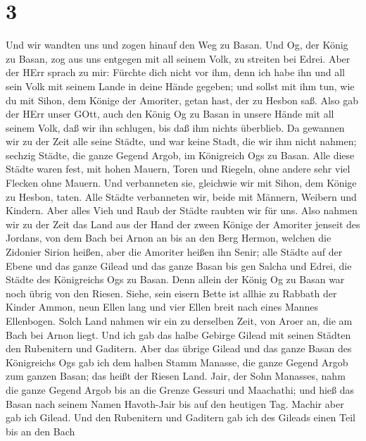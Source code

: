 \hypertarget{section-2}{%
\section{3}\label{section-2}}

 Und wir wandten uns und zogen hinauf den Weg zu Basan. Und
Og, der König zu Basan, zog aus uns entgegen mit all seinem Volk, zu
streiten bei Edrei.  Aber der HErr sprach zu mir: Fürchte
dich nicht vor ihm, denn ich habe ihn und all sein Volk mit seinem Lande
in deine Hände gegeben; und sollst mit ihm tun, wie du mit Sihon, dem
Könige der Amoriter, getan hast, der zu Hesbon saß.  Also
gab der HErr unser GOtt, auch den König Og zu Basan in unsere Hände mit
all seinem Volk, daß wir ihn schlugen, bis daß ihm nichts überblieb.
 Da gewannen wir zu der Zeit alle seine Städte, und war
keine Stadt, die wir ihm nicht nahmen; sechzig Städte, die ganze Gegend
Argob, im Königreich Ogs zu Basan.  Alle diese Städte waren
fest, mit hohen Mauern, Toren und Riegeln, ohne andere sehr viel Flecken
ohne Mauern.  Und verbanneten sie, gleichwie wir mit Sihon,
dem Könige zu Hesbon, taten. Alle Städte verbanneten wir, beide mit
Männern, Weibern und Kindern.  Aber alles Vieh und Raub der
Städte raubten wir für uns.  Also nahmen wir zu der Zeit das
Land aus der Hand der zween Könige der Amoriter jenseit des Jordans, von
dem Bach bei Arnon an bis an den Berg Hermon,  welchen die
Zidonier Sirion heißen, aber die Amoriter heißen ihn Senir;
 alle Städte auf der Ebene und das ganze Gilead und das
ganze Basan bis gen Salcha und Edrei, die Städte des Königreichs Ogs zu
Basan.  Denn allein der König Og zu Basan war noch übrig
von den Riesen. Siehe, sein eisern Bette ist allhie zu Rabbath der
Kinder Ammon, neun Ellen lang und vier Ellen breit nach eines Mannes
Ellenbogen.  Solch Land nahmen wir ein zu derselben Zeit,
von Aroer an, die am Bach bei Arnon liegt. Und ich gab das halbe Gebirge
Gilead mit seinen Städten den Rubenitern und Gaditern. 
Aber das übrige Gilead und das ganze Basan des Königreichs Ogs gab ich
dem halben Stamm Manasse, die ganze Gegend Argob zum ganzen Basan; das
heißt der Riesen Land.  Jair, der Sohn Manasses, nahm die
ganze Gegend Argob bis an die Grenze Gessuri und Maachathi; und hieß das
Basan nach seinem Namen Havoth-Jair bis auf den heutigen Tag.
 Machir aber gab ich Gilead.  Und den
Rubenitern und Gaditern gab ich des Gileads einen Teil bis an den Bach
